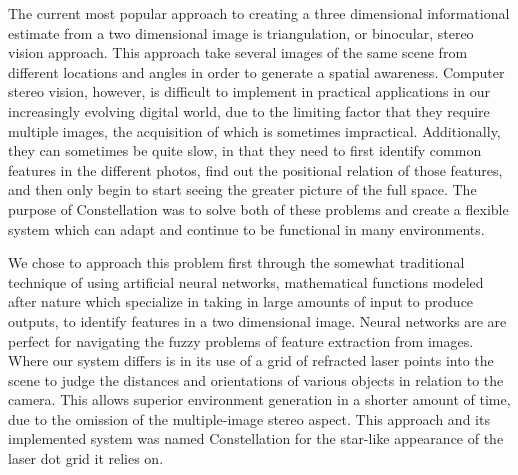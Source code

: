 The current most popular approach to creating a three dimensional informational estimate from a two dimensional image is triangulation, or binocular, stereo vision approach. This approach take several images of the same scene from different locations and angles in order to generate a spatial awareness. Computer stereo vision, however, is difficult to implement in practical applications in our increasingly evolving digital world, due to the limiting factor that they require multiple images, the acquisition of which is sometimes impractical. Additionally, they can sometimes be quite slow, in that they need to first identify common features in the different photos, find out the positional relation of those features, and then only begin to start seeing the greater picture of the full space. The purpose of Constellation was to solve both of these problems and create a flexible system which can adapt and continue to be functional in many environments.

We chose to approach this problem first through the somewhat traditional technique of using artificial neural networks, mathematical functions modeled after nature which specialize in taking in large amounts of input to produce outputs, to identify features in a two dimensional image. Neural networks are are perfect for navigating the fuzzy problems of feature extraction from images. Where our system differs is in its use of a grid of refracted laser points into the scene to judge the distances and orientations of various objects in relation to the camera. This allows superior environment generation in a shorter amount of time, due to the omission of the multiple-image stereo aspect. This approach and its implemented system was named Constellation for the star-like appearance of the laser dot grid it relies on.